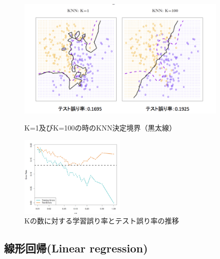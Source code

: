 \documentclass[uplatex]{jsarticle}
\begin{document}
\begin{figure}[htbp]
\begin{minipage}{0.7\hsize}
 \begin{center}
  \includegraphics[width=100mm]{img/knn_knum.png}
 \end{center}
 \caption{K=1及びK=100の時のKNN決定境界（黒太線）}
 \label{fig:one}
\end{minipage}
\begin{minipage}{0.3\hsize}
 \begin{center}
  \includegraphics[width=50mm]{img/knn_eror.png}
 \end{center}
 \caption{Kの数に対する学習誤り率とテスト誤り率の推移}
 \label{fig:two}
\end{minipage}
\end{figure}

\subsection{線形回帰(Linear regression)}
\end{document}
